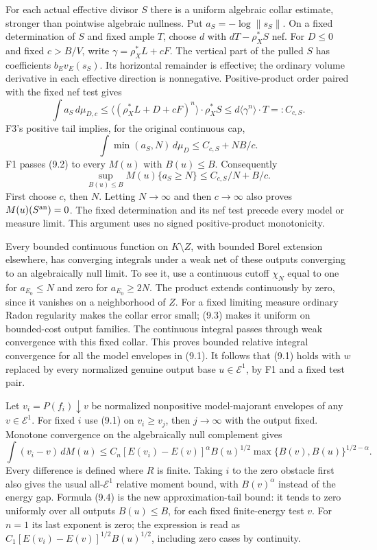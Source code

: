 \documentclass[10pt]{article}
\newcommand{\E}{\mathcal E}
\begin{document}
For each actual effective divisor $S$ there is a uniform algebraic collar
estimate, stronger than pointwise algebraic nullness. Put
$a_S=-\log\|s_S\|$. On a fixed determination of $S$ and fixed ample
$T$, choose $d$ with $dT-\rho_X^*S$ nef. For $D\leq0$ and fixed $c>B/V$,
write $\gamma=\rho_X^*L+cF$. The vertical part of the pulled $S$ has
coefficients $b_Ev_E(s_S)$. Its horizontal remainder is effective;
the ordinary volume derivative in each effective direction is nonnegative.
Positive-product order paired with the fixed nef test gives
\[
 \int a_S\,d\mu_{D,c}
 \leq\langle(\rho_X^*L+D+cF)^n\rangle\cdot\rho_X^*S
 \leq d\langle\gamma^n\rangle\cdot T=:C_{c,S}.
\]
F3's positive tail implies, for the original continuous cap,
\[
 \int\min(a_S,N)\,d\mu_D\leq C_{c,S}+NB/c.
\tag{9.2}
\]
F1 passes (9.2) to every $M(u)$ with $B(u)\leq B$. Consequently
\[
 \sup_{B(u)\leq B}M(u)\{a_S\geq N\}
 \leq C_{c,S}/N+B/c.
\tag{9.3}
\]
First choose $c$, then $N$. Letting $N\to\infty$ and then
$c\to\infty$ also proves $M(u)(S^{\rm an})=0$. The fixed determination
and its nef test precede every model or measure limit. This argument
uses no signed positive-product monotonicity.

Every bounded continuous function on $K\setminus Z$, with bounded
Borel extension elsewhere, has converging integrals under a weak net
of these outputs converging to an algebraically null limit. To see it,
use a continuous cutoff $\chi_N$ equal to one for $a_{E_0}\leq N$ and
zero for $a_{E_0}\geq2N$. The product extends continuously by zero,
since it vanishes on a neighborhood of $Z$. For a fixed limiting measure
ordinary Radon regularity makes the collar error small; (9.3) makes it
uniform on bounded-cost output families. The continuous integral passes
through weak convergence with this fixed collar. This proves bounded
relative integral convergence for all the model envelopes in (9.1).
It follows that (9.1) holds with $w$ replaced by every normalized
genuine output base $u\in\E^1$, by F1 and a fixed test pair.

Let $v_i=P(f_i)\downarrow v$ be normalized nonpositive model-majorant
envelopes of any $v\in\E^1$. For fixed $i$ use (9.1) on $v_i\geq v_j$,
then $j\to\infty$ with the output fixed. Monotone convergence on the
algebraically null complement gives
\[
 \int(v_i-v)\,dM(u)\leq
 C_n[E(v_i)-E(v)]^\alpha B(u)^{1/2}
       \max\{B(v),B(u)\}^{1/2-\alpha}.
\tag{9.4}
\]
Every difference is defined where $R$ is finite. Taking $i$ to the
zero obstacle first also gives the usual all-$\E^1$ relative moment
bound, with $B(v)^\alpha$ instead of the energy gap. Formula (9.4)
is the new approximation-tail bound: it tends to zero uniformly over
all outputs $B(u)\leq B$, for each fixed finite-energy test $v$.
For $n=1$ its last exponent is zero; the expression is read as
$C_1[E(v_i)-E(v)]^{1/2}B(u)^{1/2}$, including zero cases by continuity.
\end{document}
